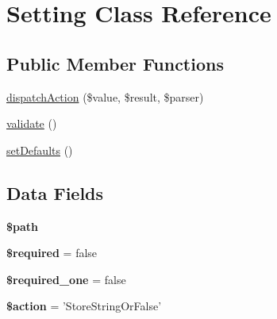 \hypertarget{class_hypo_conf_1_1_config_parser_1_1_setting}{
\section{\-Setting \-Class \-Reference}
\label{class_hypo_conf_1_1_config_parser_1_1_setting}
}
\subsection*{\-Public \-Member \-Functions}
\begin{DoxyCompactItemize}
\item 
\hyperlink{class_hypo_conf_1_1_config_parser_1_1_setting_a0ecfad7330b11211d958ca9cb985b33f}{dispatch\-Action} (\$value, \$result, \$parser)
\item 
\hyperlink{class_hypo_conf_1_1_config_parser_1_1_setting_a184909dab34698899937d810a9f5d393}{validate} ()
\item 
\hyperlink{class_hypo_conf_1_1_config_parser_1_1_setting_ac900283b8780520c328c6457e34177f4}{set\-Defaults} ()
\end{DoxyCompactItemize}
\subsection*{\-Data \-Fields}
\begin{DoxyCompactItemize}
\item 
\hypertarget{class_hypo_conf_1_1_config_parser_1_1_setting_a0a4baf0b22973c07685c3981f0d17fc4}{
{\bfseries \$path}}
\label{class_hypo_conf_1_1_config_parser_1_1_setting_a0a4baf0b22973c07685c3981f0d17fc4}

\item 
\hypertarget{class_hypo_conf_1_1_config_parser_1_1_setting_a38addc8a958af4b42bda4fca677b4208}{
{\bfseries \$required} = false}
\label{class_hypo_conf_1_1_config_parser_1_1_setting_a38addc8a958af4b42bda4fca677b4208}

\item 
\hypertarget{class_hypo_conf_1_1_config_parser_1_1_setting_a4ef1c75208da8a21cee85665f66eeb58}{
{\bfseries \$required\-\_\-one} = false}
\label{class_hypo_conf_1_1_config_parser_1_1_setting_a4ef1c75208da8a21cee85665f66eeb58}

\item 
\hypertarget{class_hypo_conf_1_1_config_parser_1_1_setting_aa698a3e72116e8e778be0e95d908ee30}{
{\bfseries \$action} = '\-Store\-String\-Or\-False'}
\label{class_hypo_conf_1_1_config_parser_1_1_setting_aa698a3e72116e8e778be0e95d908ee30}

\end{DoxyCompactItemize}


